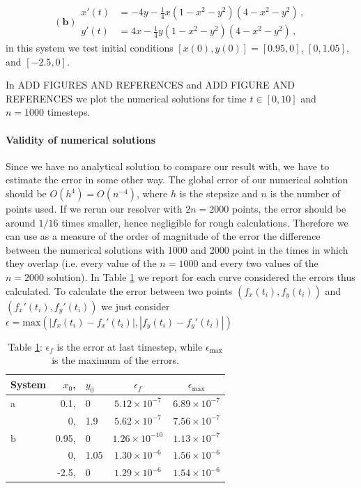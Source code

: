 \documentclass[a4paper,11]{article}
\begin{document}
\[
    \mathbf{(b)} \begin{split}
      x'(t) & = - 4y - \tfrac{1}{4}x(1-x^2-y^2)(4-x^2-y^2)\,,\\[2.5mm]
      y'(t) & = 4x - \tfrac{1}{4}y(1-x^2-y^2)(4-x^2-y^2)\,,
    \end{split}
\]
in this system we test initial conditions $[x(0),y(0)]=[0.95,0]$, 
$[0,1.05]$, and $[-2.5,0]$.

In ADD FIGURES AND REFERENCES and ADD FIGURE AND REFERENCES we plot 
the numerical solutions for time $t\in [0,10]$ and $n=1000$ timesteps.

\paragraph{Validity of numerical solutions}

Since we have no analytical solution to compare our result with, we have to 
estimate the error in some other way. 
The global error of our numerical solution should be $O(h^{4})=O(n^{-4})$,
where $h$ is the stepsize and $n$ is the number of points used. If we rerun 
our resolver with $2n=2000$ points, the error should be around $1/16$ times 
smaller, hence negligible for rough calculations.
Therefore we can use as a measure of the order of magnitude of the error 
the difference between the numerical solutions with 1000 and 2000 point in the 
times in which they overlap (i.e. every value of the $n=1000$ and every
two values of the $n=2000$ solution).
In Table \ref{table:rk4_error} we report for each curve considered the errors thus 
calculated. To calculate the error between two points 
$(f_{x}(t_{i}),f_{y}(t_{i}))$ and $(f_{x}'(t_{i}),f_{y}'(t_{i}))$ we just 
consider $\epsilon = 
\text{max}(|f_{x}(t_{i})-f_{x}'(t_{i})|,|f_{y}(t_{i})-f_{y}'(t_{i})|)$

\begin{table}[ht]
	\centering
	\begin{tabular}{l | r@{}l | c | c }
		System & $x_{0}$,&$y_{0}$ & $\epsilon_{f}$ & $\epsilon_{\text{max}}$\\
		\hline
		a & 0.1,&0 & $5.12 \times 10^{-7}$  & $6.89 \times 10^{-7}$\\
		  & 0,& 1.9 & $5.62 \times 10^{-7}$  & $7.56 \times 10^{-7}$\\
		b & 0.95,&0 & $1.26 \times 10^{-10}$ & $1.13 \times 10^{-7}$\\
		  & 0,&1.05 & $1.30 \times 10^{-6}$  & $1.56 \times 10^{-6}$\\
		  & -2.5,&0 & $1.29 \times 10^{-6}$  & $1.54 \times 10^{-6}$\\
	\end{tabular}
	\caption{Table \ref{table:rk4_error}: $\epsilon_{f}$ is the error at last 
		timestep, while $\epsilon_{\text{max}}$ is the maximum of the errors.}
	\label{table:rk4_error}
\end{table}
\end{document}
